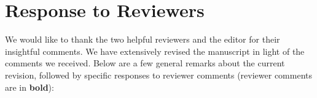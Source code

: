 % 
% 
%  
% 

\onecolumn
\setcounter{page}{1}
\section*{Response to Reviewers} %
\label{sec:response_to_reviewers}


We would like to thank the two helpful reviewers and the editor for their insightful comments.  We have extensively revised the manuscript in light of the comments we received.  Below are a few general remarks about the current revision, followed by specific responses to reviewer comments (reviewer comments are in \textbf{bold}):

